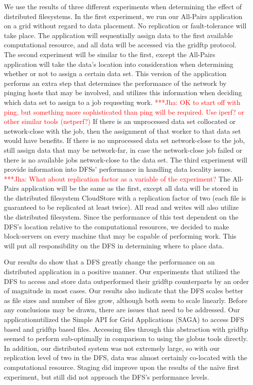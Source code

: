 \documentclass[a4paper,11pt]{article}
\newcommand{\jhanote}[1]{ {\textcolor{red} { ***Jha: #1 }}}
\newcommand{\jhanote}[1]{}
\begin{document}
We use the results of three different experiments when determining the effect of distributed filesystems. In the first experiment, we run our All-Pairs application on a grid without regard to data placement. No replication or fault-tolerance will take place. The application will sequentially assign data to the first available computational resource, and all data will be accessed via the gridftp protocol. The second experiment will be similar to the first, except the All-Pairs application will take the data's location into consideration when determining whether or not to assign a certain data set. This version of the application performs an extra step that determines the performance of the network by pinging hosts that may be involved, and utilizes this information when deciding which data set to assign to a job requesting work. \jhanote{OK to start off with ping, but something more sophisticated than ping will be required. Use iperf? or other similar tools (netperf?)} If there is an unprocessed data set collocated or network-close with the job, then the assignment of that worker to that data set would have benefits. If there is no unprocessed data set network-close to the job, still assign data that may be network-far, in case the network-close job failed or there is no available jobs network-close to the data set. The third experiment will provide information into DFSs' performance in handling data locality issues. \jhanote{What about replication factor as a variable of the experiment?} The All-Pairs application will be the same as the first, except all data will be stored in the distributed filesystem CloudStore with a replication factor of two (each file is guaranteed to be replicated at least twice). All read and writes will also utilize the distributed filesystem. Since the performance of this test dependent on the DFS's location relative to the computational resources, we decided to make block-servers on every machine that may be capable of performing work. This will put all responsibility on the DFS in determining where to place data.

Our results do show that a DFS greatly change the performance on an distributed application in a positive manner.  Our experiments that utilized the DFS to access and store data outperformed their gridftp counterparts by an order of magnitude in most cases.  Our results also indicate that the DFS scales better as file sizes and number of files grow, although both seem to scale linearly. Before any conclusions may be drawn, there are issues that need to be addressed. Our applicationutilized the Simple API for Grid Applications (SAGA) to access DFS based and gridftp based files. Accessing files through this abstraction with gridftp seemed to perform sub-optimally in comparison to using the globus tools directly. In addition, our distributed system was not extremely large, so with our replication level of two in the DFS, data was almost certainly co-located with the computational resource. Staging did improve upon the results of the naïve first experiment, but still did not approach the DFS's performance levels. 
\end{document}
